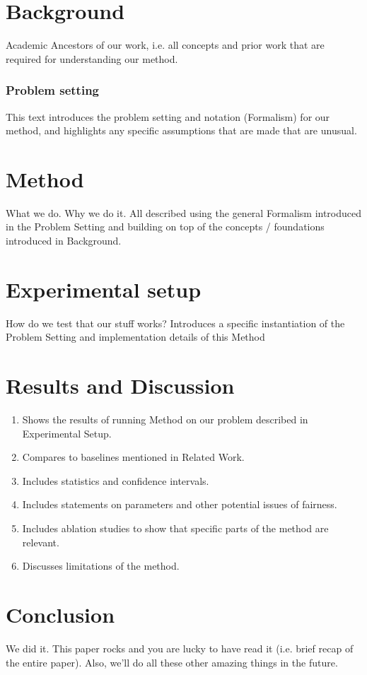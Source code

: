 \documentclass[10pt,a4paper]{article}
\begin{document}
\section{Background}
Academic Ancestors of our work, i.e. all concepts and prior work that are required for understanding our method.
\subsubsection{Problem setting}
This text introduces the problem setting and notation (Formalism) for our method, and
highlights any specific assumptions that are made that are unusual.

\section{Method}
What we do. Why we do it. All described using the general Formalism introduced in
the Problem Setting and building on top of the concepts / foundations introduced in
Background.

\section{Experimental setup}

How do we test that our stuff works? Introduces a specific instantiation of the Problem Setting and implementation details of this Method


\section{Results and Discussion}

\begin{enumerate}
	\item Shows the results of running Method on our problem described in Experimental Setup. 
	\item Compares to baselines mentioned in Related Work. 
	\item Includes statistics and confidence intervals. 
	\item Includes statements on parameters and other potential issues of fairness. 
	\item Includes ablation studies to show that specific parts of the method are relevant. 
	\item Discusses limitations of the method. 
\end{enumerate}

\section{Conclusion}

We did it. This paper rocks and you are lucky to have read it (i.e. brief recap of the entire paper). 
Also, we’ll do all these other amazing things in the future.




	
\end{document}
